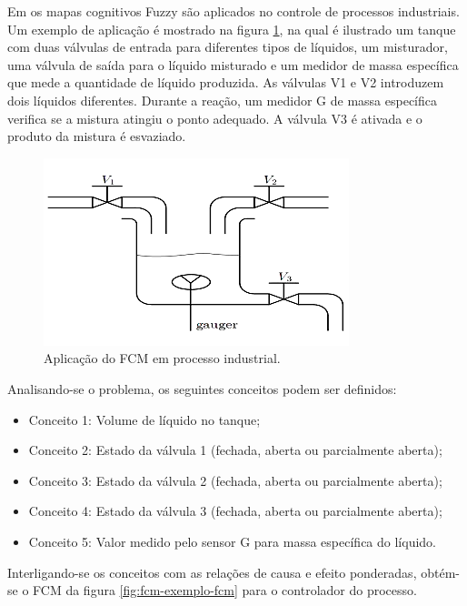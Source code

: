 Em \cite{FCMENDONCA} os mapas cognitivos Fuzzy são aplicados no controle de processos industriais. Um exemplo de aplicação é mostrado na figura \ref{fig:fcm-exemplo-planta}, na qual é ilustrado um tanque com duas válvulas de entrada para diferentes tipos de líquidos, um misturador, uma válvula de saída para o líquido misturado e um medidor de massa específica que mede a quantidade de líquido produzida. As válvulas V1 e V2 introduzem
dois líquidos diferentes. Durante a reação, um medidor G de massa específica verifica se a mistura atingiu
o ponto adequado. A válvula V3 é ativada e o produto da mistura é esvaziado.

\begin{figure}[!htb]
    \centering
    \includegraphics{./figs/fcm-exemplo-planta.png}
    \caption[Mapa Cognitivo Fuzzy]{Aplicação do FCM em processo industrial.}
    \label{fig:fcm-exemplo-planta}
\end{figure}

Analisando-se o problema, os seguintes conceitos podem ser definidos:

\begin{itemize}
\item Conceito 1: Volume de líquido no tanque;
\item Conceito 2: Estado da válvula 1 (fechada, aberta ou parcialmente aberta);
\item Conceito 3: Estado da válvula 2 (fechada, aberta ou parcialmente aberta);
\item Conceito 4: Estado da válvula 3 (fechada, aberta ou parcialmente aberta);
\item Conceito 5: Valor medido pelo sensor G para massa específica do líquido.
\end{itemize}

Interligando-se os conceitos com as relações de causa e efeito ponderadas, obtém-se o FCM da figura \ref{fig:fcm-exemplo-fcm} para o controlador do processo.

